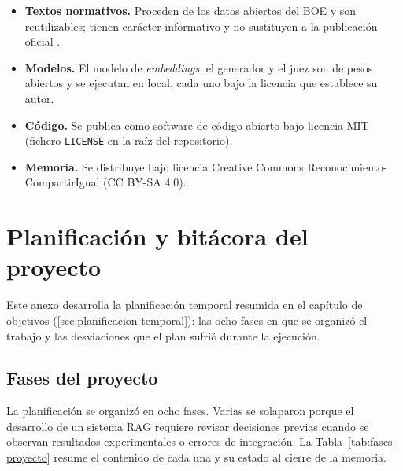 \begin{itemize}
  \item \textbf{Textos normativos.} Proceden de los datos abiertos del BOE y son reutilizables; tienen carácter informativo y no sustituyen a la publicación oficial \cite{boeLegislacionActualizada}.
  \item \textbf{Modelos.} El modelo de \emph{embeddings}, el generador y el juez son de pesos abiertos y se ejecutan en local, cada uno bajo la licencia que establece su autor.
  \item \textbf{Código.} Se publica como software de código abierto bajo licencia MIT (fichero \texttt{LICENSE} en la raíz del repositorio).
  \item \textbf{Memoria.} Se distribuye bajo licencia Creative Commons Reconocimiento-CompartirIgual (CC BY-SA 4.0).
\end{itemize}

\chapter{Planificación y bitácora del proyecto}
\label{app:planificacion}

Este anexo desarrolla la planificación temporal resumida en el capítulo de objetivos (\ref{sec:planificacion-temporal}): las ocho fases en que se organizó el trabajo y las desviaciones que el plan sufrió durante la ejecución.

\section{Fases del proyecto}
\label{sec:app-fases}

La planificación se organizó en ocho fases. Varias se solaparon porque el desarrollo de un sistema RAG requiere revisar decisiones previas cuando se observan resultados experimentales o errores de integración. La Tabla~\ref{tab:fases-proyecto} resume el contenido de cada una y su estado al cierre de la memoria.


